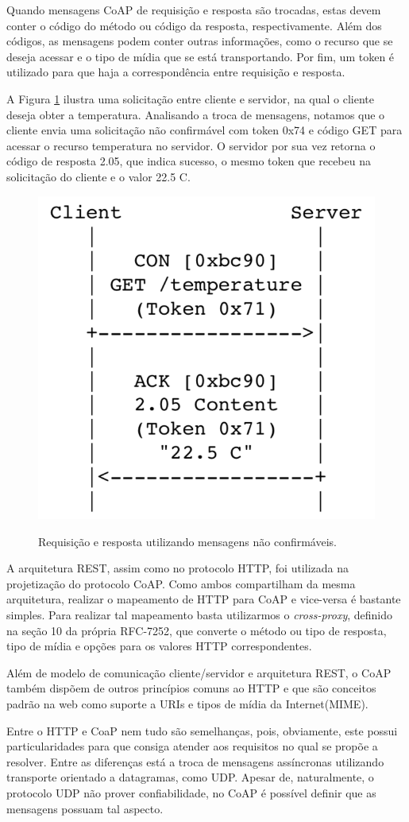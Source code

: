 Quando mensagens CoAP de requisição e resposta são trocadas, estas devem conter o código do método ou código da resposta, respectivamente.
Além dos códigos, as mensagens podem conter outras informações, como o recurso que se deseja acessar e o tipo de mídia que se está transportando.
Por fim, um token é utilizado para que haja a correspondência entre requisição e resposta.

A Figura \ref{fig:fig4} ilustra uma solicitação entre cliente e servidor, na qual o cliente deseja obter a temperatura.
Analisando a troca de mensagens, notamos que o cliente envia uma solicitação não confirmável com token 0x74 e código GET para acessar o recurso temperatura no servidor.
O servidor por sua vez retorna o código de resposta 2.05, que indica sucesso, o mesmo token que recebeu na solicitação do cliente e o valor 22.5 C.


\begin{figure}[htb!]
    \centering\includegraphics[height=.4\textwidth]{fig4.png} 
    \caption
    {\label{fig:fig4} Requisição e resposta utilizando mensagens não confirmáveis.} \cite{rfc7252}
\end{figure}

A arquitetura REST, assim como no protocolo HTTP\cite{rfc2616}, foi utilizada na projetização do protocolo CoAP.
Como ambos compartilham da mesma arquitetura, realizar o mapeamento de HTTP para CoAP e vice-versa é bastante simples.
Para realizar tal mapeamento basta utilizarmos o \textit{cross-proxy}, definido na seção 10 da própria RFC-7252\cite{rfc7252},
que converte o método ou tipo de resposta, tipo de mídia e opções para os valores HTTP correspondentes.

Além de modelo de comunicação cliente/servidor e arquitetura REST, o CoAP também dispõem de outros princípios comuns ao HTTP e que são conceitos padrão na web
como suporte a URIs\cite{rfc3986} e tipos de mídia da Internet(MIME)\cite{rfc2046}.

Entre o HTTP e CoaP nem tudo são semelhanças, pois, obviamente, este possui particularidades para que consiga atender aos requisitos no qual se propõe a resolver.
Entre as diferenças está a troca de mensagens assíncronas utilizando transporte orientado a datagramas, como UDP.
Apesar de, naturalmente, o protocolo UDP não prover confiabilidade, no CoAP é possível definir que as mensagens possuam tal aspecto.

